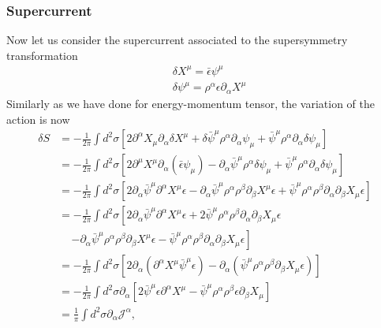 \documentclass[graybox,envcountchap,sectrefs]{svmono}
\begin{document}
\subsubsection*{Supercurrent}
Now let us consider the supercurrent associated to the supersymmetry transformation
\begin{align}
&\delta X^{\mu}=\bar{\epsilon}\psi^{\mu}\\
&\delta \psi^{\mu}=\rho^{\alpha}\epsilon\partial_{\alpha}X^{\mu}
\end{align}	
Similarly as we have done for energy-momentum tensor, the variation of the action is now
\begin{equation}
\begin{aligned}
\delta S &=-\frac{1}{2 \pi} \int d^{2} \sigma\left[2 \partial^{\alpha} X_{\mu} \partial_{\alpha} \delta X^{\mu}+\delta \bar{\psi}^{\mu} \rho^{\alpha} \partial_{\alpha} \psi_{\mu}+\bar{\psi}^{\mu} \rho^{\alpha} \partial_{\alpha} \delta \psi_{\mu}\right] \\
&=-\frac{1}{2 \pi} \int d^{2} \sigma\left[2 \partial^{\mu} X^{\mu} \partial_{\alpha}\left(\bar{\epsilon} \psi_{\mu}\right)-\partial_{\alpha} \bar{\psi}^{\mu} \rho^{\alpha} \delta \psi_{\mu}+\bar{\psi}^{\mu} \rho^{\alpha} \partial_{\alpha} \delta \psi_{\mu}\right] \\
&=-\frac{1}{2 \pi} \int d^{2} \sigma\left[2 \partial_{\alpha} \bar{\psi}^{\mu} \partial^{\alpha} X^{\mu} \epsilon-\partial_{\alpha} \bar{\psi}^{\mu} \rho^{\alpha} \rho^{\beta} \partial_{\beta} X^{\mu} \epsilon+\bar{\psi}^{\mu} \rho^{\alpha} \rho^{\beta} \partial_{\alpha} \partial_{\beta} X_{\mu} \epsilon\right] \\
&=-\frac{1}{2 \pi} \int d^{2} \sigma\left[2 \partial_{\alpha} \bar{\psi}^{\mu} \partial^{\alpha} X^{\mu} \epsilon+2 \bar{\psi}^{\mu} \rho^{\alpha} \rho^{\beta} \partial_{\alpha} \partial_{\beta} X_{\mu} \epsilon\right.\\
&\,\,\,\,\,\,\,\left.-\partial_{\alpha} \bar{\psi}^{\mu} \rho^{\alpha} \rho^{\beta} \partial_{\beta} X^{\mu} \epsilon-\bar{\psi}^{\mu} \rho^{\alpha} \rho^{\beta} \partial_{\alpha} \partial_{\beta} X_{\mu} \epsilon\right] \\
&=-\frac{1}{2 \pi} \int d^{2} \sigma\left[2 \partial_{\alpha}\left(\partial^{\alpha} X^{\mu} \bar{\psi}^{\mu} \epsilon\right)-\partial_{\alpha}\left(\bar{\psi}^{\mu} \rho^{\alpha} \rho^{\beta} \partial_{\beta} X_{\mu} \epsilon\right)\right] \\
&=-\frac{1}{2 \pi} \int d^{2} \sigma \partial_{\alpha}\left[2 \bar{\psi}^{\mu} \epsilon \partial^{\alpha} X^{\mu}-\bar{\psi}^{\mu} \rho^{\alpha} \rho^{\beta} \epsilon \partial_{\beta} X_{\mu}\right]\\
&=\frac{1}{\pi}\int d^{2} \sigma \partial_{\alpha} \mathcal{J}^{\alpha},
\end{aligned}
\end{equation}
\end{document}
